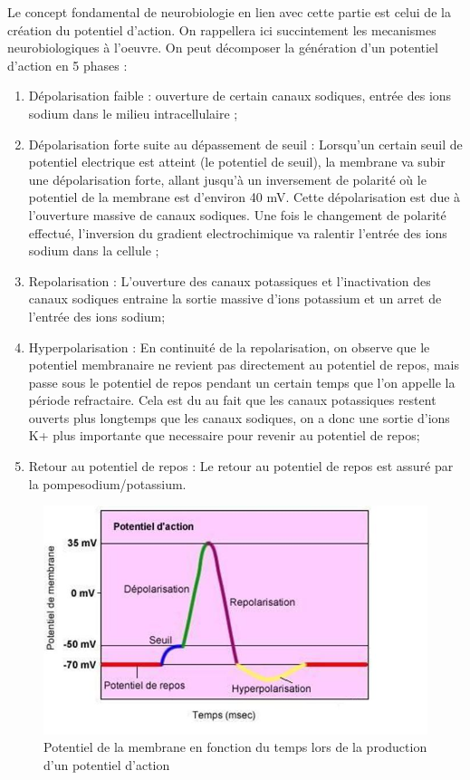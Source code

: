 \documentclass[12pt]{scrartcl}
\begin{document}
	Le concept fondamental de neurobiologie en lien avec cette partie est celui de la création du potentiel d'action. On rappellera ici succintement les mecanismes neurobiologiques à l'oeuvre. On peut décomposer la génération d'un potentiel d'action en 5 phases :
	\begin{enumerate} \item Dépolarisation faible : ouverture de certain canaux sodiques, entrée des ions sodium dans le milieu intracellulaire ;
	\item Dépolarisation forte suite au dépassement de seuil : Lorsqu'un certain seuil de potentiel electrique est atteint (le potentiel de seuil), la membrane va subir une dépolarisation forte, allant jusqu'à un inversement de polarité où le potentiel de la membrane est d'environ 40 mV. Cette dépolarisation est due à l'ouverture massive de canaux sodiques. Une fois le changement de polarité effectué, l'inversion du gradient electrochimique va ralentir l'entrée des ions sodium dans la cellule ;
	\item Repolarisation : L'ouverture des canaux potassiques et l'inactivation des canaux sodiques entraine la sortie massive d'ions potassium et un arret de l'entrée des ions sodium;
	\item Hyperpolarisation : En continuité de la repolarisation, on observe que le potentiel membranaire ne revient pas directement au potentiel de repos, mais passe sous le potentiel de repos pendant un certain temps que l'on appelle la période refractaire. Cela est du au fait que les canaux potassiques restent ouverts plus longtemps que les canaux sodiques, on a donc une sortie d'ions K+ plus importante que necessaire pour revenir au potentiel de repos;
	\item Retour au potentiel de repos : Le retour au potentiel de repos est assuré par la pompesodium/potassium.
	\end{enumerate}

\begin{figure}[!h]
\centering
\includegraphics{imgs/2.JPG}
\caption{Potentiel de la membrane en fonction du temps lors de la production d'un potentiel d'action}
\end{figure}
\end{document}
